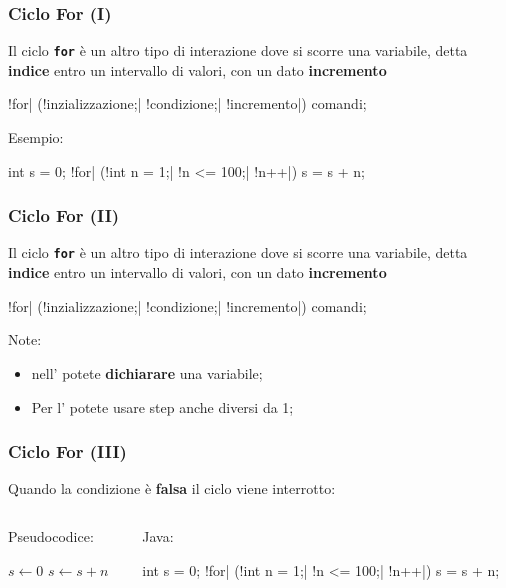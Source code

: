 \begin{frame}[fragile]\frametitle{Ciclo For (I)}
  Il ciclo \textbf{\texttt{for}} è un altro tipo di interazione dove si scorre una variabile,
  detta \textbf{indice} entro un intervallo di valori, con un dato \textbf{incremento}

  \begin{JavaCodePlain}[commandchars=\\!|]
    \Word!for| (\Blue!inzializzazione;| \Green!condizione;| \Violet!incremento|) {
      comandi;
    }
  \end{JavaCodePlain}

  Esempio:
  \begin{JavaCodePlain}[commandchars=\\!|]
    int s = 0;
    \Word!for| (\Blue!int n = 1;| \Green!n <= 100;| \Violet!n++|) {
      s = s + n;
    }
  \end{JavaCodePlain}

\end{frame}

\begin{frame}[fragile]\frametitle{Ciclo For (II)}
  Il ciclo \textbf{\texttt{for}} è un altro tipo di interazione dove si scorre una variabile,
  detta \textbf{indice} entro un intervallo di valori, con un dato \textbf{incremento}

  \begin{JavaCodePlain}[commandchars=\\!|]
    \Word!for| (\Blue!inzializzazione;| \Green!condizione;| \Violet!incremento|) {
      comandi;
    }
  \end{JavaCodePlain}

  Note:
  \begin{itemize}
   \item nell'\texttt{} potete \textbf{dichiarare} una variabile;
   \item Per l'\texttt{} potete usare step anche diversi da 1;
  \end{itemize}

\end{frame}

\begin{frame}[fragile]\frametitle{Ciclo For (III)}
  Quando la condizione è \textbf{falsa} il ciclo viene interrotto:
  \begin{columns}[T]
    \begin{column}[T]{5cm}
      Pseudocodice:
      \begin{algorithmic}[1]     
	\State $s \gets 0$
	  \State $s \gets s + n$
	\EndFor
      \end{algorithmic}
    \end{column}
    \begin{column}[T]{6cm}
      Java:
      \begin{JavaCodePlain}[commandchars=\\!|]
	int s = 0;
	\Word!for| (\Blue!int n = 1;| \Green!n <= 100;| \Violet!n++|) {
	  s = s + n;
	}
      \end{JavaCodePlain}
    \end{column}
  \end{columns}
\end{frame}

